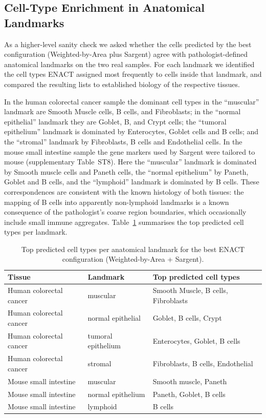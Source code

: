 \documentclass[11pt]{article}
\begin{document}
\subsection{Cell-Type Enrichment in Anatomical Landmarks}

As a higher-level sanity check we asked whether the cells predicted by the best configuration (Weighted-by-Area plus Sargent) agree with pathologist-defined anatomical landmarks on the two real samples. For each landmark we identified the cell types ENACT assigned most frequently to cells inside that landmark, and compared the resulting lists to established biology of the respective tissues.

In the human colorectal cancer sample the dominant cell types in the ``muscular'' landmark are Smooth Muscle cells, B cells, and Fibroblasts; in the ``normal epithelial'' landmark they are Goblet, B, and Crypt cells; the ``tumoral epithelium'' landmark is dominated by Enterocytes, Goblet cells and B cells; and the ``stromal'' landmark by Fibroblasts, B cells and Endothelial cells. In the mouse small intestine sample the gene markers used by Sargent were tailored to mouse (supplementary Table~ST8). Here the ``muscular'' landmark is dominated by Smooth muscle cells and Paneth cells, the ``normal epithelium'' by Paneth, Goblet and B cells, and the ``lymphoid'' landmark is dominated by B cells. These correspondences are consistent with the known histology of both tissues: the mapping of B cells into apparently non-lymphoid landmarks is a known consequence of the pathologist's coarse region boundaries, which occasionally include small immune aggregates. Table~\ref{tab:landmarks} summarises the top predicted cell types per landmark.

\begin{table}[htbp]
\centering
\caption{Top predicted cell types per anatomical landmark for the best ENACT configuration (Weighted-by-Area + Sargent).}
\label{tab:landmarks}
\begin{tabular}{llp{6.5cm}}
\toprule
Tissue & Landmark & Top predicted cell types \\
\midrule
Human colorectal cancer & muscular & Smooth Muscle, B cells, Fibroblasts \\
Human colorectal cancer & normal epithelial & Goblet, B cells, Crypt \\
Human colorectal cancer & tumoral epithelium & Enterocytes, Goblet, B cells \\
Human colorectal cancer & stromal & Fibroblasts, B cells, Endothelial \\
Mouse small intestine & muscular & Smooth muscle, Paneth \\
Mouse small intestine & normal epithelium & Paneth, Goblet, B cells \\
Mouse small intestine & lymphoid & B cells \\
\bottomrule
\end{tabular}
\end{table}
\end{document}
